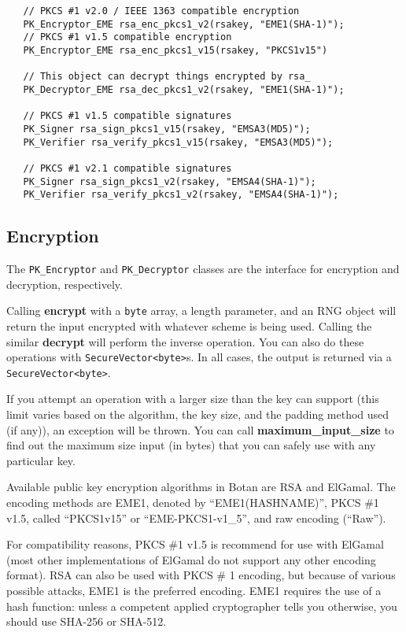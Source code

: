 \documentclass{article}
\newcommand{\function}[1]{\textbf{#1}}
\newcommand{\type}[1]{\texttt{#1}}
\begin{document}
\begin{verbatim}
   // PKCS #1 v2.0 / IEEE 1363 compatible encryption
   PK_Encryptor_EME rsa_enc_pkcs1_v2(rsakey, "EME1(SHA-1)");
   // PKCS #1 v1.5 compatible encryption
   PK_Encryptor_EME rsa_enc_pkcs1_v15(rsakey, "PKCS1v15")

   // This object can decrypt things encrypted by rsa_
   PK_Decryptor_EME rsa_dec_pkcs1_v2(rsakey, "EME1(SHA-1)");

   // PKCS #1 v1.5 compatible signatures
   PK_Signer rsa_sign_pkcs1_v15(rsakey, "EMSA3(MD5)");
   PK_Verifier rsa_verify_pkcs1_v15(rsakey, "EMSA3(MD5)");

   // PKCS #1 v2.1 compatible signatures
   PK_Signer rsa_sign_pkcs1_v2(rsakey, "EMSA4(SHA-1)");
   PK_Verifier rsa_verify_pkcs1_v2(rsakey, "EMSA4(SHA-1)");
\end{verbatim}

\subsection{Encryption}

The \type{PK\_Encryptor} and \type{PK\_Decryptor} classes are the
interface for encryption and decryption, respectively.

Calling \function{encrypt} with a \type{byte} array, a length
parameter, and an RNG object will return the input encrypted with
whatever scheme is being used. Calling the similar \function{decrypt}
will perform the inverse operation. You can also do these operations
with \type{SecureVector<byte>}s. In all cases, the output is returned
via a \type{SecureVector<byte>}.

If you attempt an operation with a larger size than the key can
support (this limit varies based on the algorithm, the key size, and
the padding method used (if any)), an exception will be thrown. You
can call \function{maximum\_input\_size} to find out the maximum size
input (in bytes) that you can safely use with any particular key.

Available public key encryption algorithms in Botan are RSA and
ElGamal. The encoding methods are EME1, denoted by ``EME1(HASHNAME)'',
PKCS \#1 v1.5, called ``PKCS1v15'' or ``EME-PKCS1-v1\_5'', and raw
encoding (``Raw'').

For compatibility reasons, PKCS \#1 v1.5 is recommend for use with
ElGamal (most other implementations of ElGamal do not support any
other encoding format). RSA can also be used with PKCS \# 1 encoding,
but because of various possible attacks, EME1 is the preferred
encoding. EME1 requires the use of a hash function: unless a competent
applied cryptographer tells you otherwise, you should use SHA-256 or
SHA-512.
\end{document}
